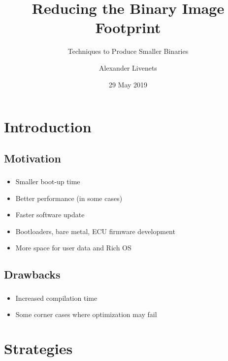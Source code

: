 \documentclass{beamer}
\title{Reducing the Binary Image Footprint}
\subtitle{Techniques to Produce Smaller Binaries}
\author{Alexander Livenets}
\institute{}
\date{29 May 2019}
\begin{document}

\begin{frame}
\titlepage
\end{frame}

\section{Introduction}

\subsection{Motivation}
\begin{frame}
\frametitle{\subsecname}
	\begin{itemize}
		\item Smaller boot-up time
		\item Better performance (in some cases)
		\item Faster software update
		\item Bootloaders, bare metal, ECU firmware development
        \item More space for user data and Rich OS
	\end{itemize}
\end{frame}

\subsection{Drawbacks}
\begin{frame}
\frametitle{\subsecname}
	\begin{itemize}
		\item Increased compilation time
		\item Some corner cases where optimization may fail
	\end{itemize}
\end{frame}

\section{Strategies}
\end{document}
